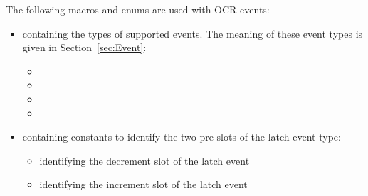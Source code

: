 The following macros and enums are used with OCR events:
\begin{itemize}
\item \hypertarget{type_ocrEventTypes_t}{} containing the types of supported events. The
meaning of these event types is given in Section~\ref{sec:Event}:
  \begin{itemize}
    \item {}
    \item {}
    \item {}
    \item {}
  \end{itemize}
\item \hypertarget{type_ocrLatchEventSlots}{} containing constants to
identify the two pre-slots of the latch event type:
  \begin{itemize}
    \item {} identifying the decrement slot of
      the latch event
    \item {} identifying the increment slot of
      the latch event
  \end{itemize}
\end{itemize}

